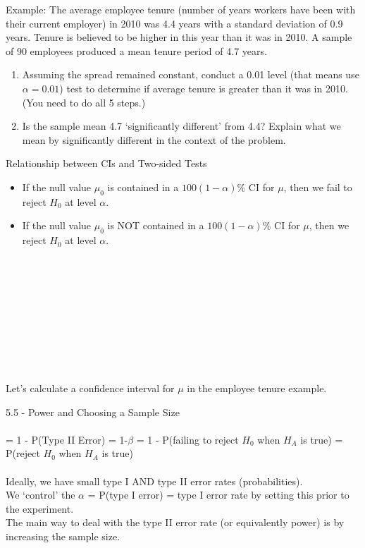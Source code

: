\newpage

Example: The average employee tenure (number of years workers have been with their current employer) in 2010 was 4.4 years with a standard deviation of 0.9 years. Tenure is believed to be higher in this year than it was in 2010. A sample of 90 employees produced a mean tenure period of 4.7 years. 
\begin{enumerate}
\item Assuming the spread remained constant, conduct a 0.01 level (that means use $\alpha=0.01$) test to determine if average tenure is greater than it was in 2010. (You need to do all 5 steps.)
\item Is the sample mean 4.7 `significantly different' from 4.4?  Explain what we mean by significantly different in the context of the problem.
\end{enumerate}

\newpage


Relationship between CIs and Two-sided Tests
\begin{itemize}
\item If the null value $\mu_0$ is contained in a $100(1-\alpha)$\% CI for $\mu$, then we fail to reject $H_0$ at level $\alpha$.
\item If the null value $\mu_0$ is NOT contained in a $100(1-\alpha)$\% CI for $\mu$, then we reject $H_0$ at level $\alpha$.\\~\\~\\~\\~\\~\\~\\~\\~\\~\\
\end{itemize}

Let's calculate a confidence interval for $\mu$ in the employee tenure example.

\newpage

\Large 5.5 - Power and Choosing a Sample Size \normalsize\\~\\

\underbar{~~~~~~~~~~~~~~~~~~~~~~~~~~~~~~~~~} = 1 - P(Type II Error) = 1-$\beta$ = 1 - P(failing to reject $H_0$ when $H_A$ is true) = P(reject $H_0$ when $H_A$ is true)\\~\\

Ideally, we have small type I AND type II error rates (probabilities).  \\
We `control' the $\alpha$ = P(type I error) = type I error rate by setting this prior to the experiment.  \\
The main way to deal with the type II error rate (or equivalently power) is by increasing the sample size.\\~\\

